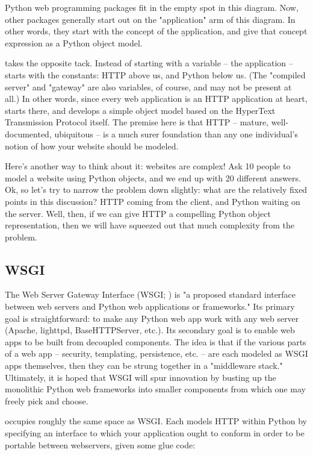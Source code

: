 Python web programming packages fit in the empty spot in this diagram. Now,
other packages generally start out on the "application" arm of this diagram. In
other words, they start with the concept of the \b{application}, and give that
concept expression as a Python object model.

 takes the opposite tack. Instead of starting with a variable --
the application --  starts with the constants: HTTP above us, and
Python below us. (The "compiled server" and "gateway" are also variables, of
course, and may not be present at all.) In other words, since every web
application is an HTTP application at heart,  starts there, and
develops a simple object model based on the HyperText Transmission Protocol
itself. The premise here is that HTTP -- mature, well-documented, ubiquitous --
is a much surer foundation than any one individual's notion of how your website
should be modeled.

Here's another way to think about it: websites are complex! Ask 10 people to
model a website using Python objects, and we end up with 20 different answers.
Ok, so let's try to narrow the problem down slightly: what are the relatively
fixed points in this discussion? HTTP coming from the client, and Python waiting
on the server. Well, then, if we can give HTTP a compelling Python object
representation, then we will have squeezed out that much complexity from the
problem.


\subsection{WSGI \label{wsgi}}

The Web Server Gateway Interface (WSGI; ) is "a proposed standard
interface between web servers and Python web applications or frameworks." Its
primary goal is straightforward: to make any Python web app work with any web
server (Apache, lighttpd, BaseHTTPServer, etc.). Its secondary goal is to enable
web apps to be built from decoupled components. The idea is that if the various
parts of a web app -- security, templating, persistence, etc. -- are each
modeled as WSGI apps themselves, then they can be strung together in a
"middleware stack." Ultimately, it is hoped that WSGI will spur innovation by
busting up the monolithic Python web frameworks into smaller components from
which one may freely pick and choose.

 occupies roughly the same space as WSGI. Each models HTTP within
Python by specifying an interface to which your application ought to conform in
order to be portable between webservers, given some glue code:

